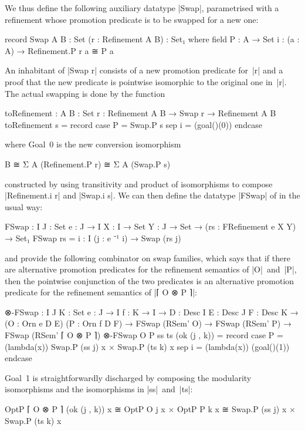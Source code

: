 We thus define the following auxiliary datatype |Swap|, parametrised with a refinement whose promotion predicate is to be swapped for a new one:
\begin{code}
record Swap {A B : Set} (r : Refinement A B) : Set₁ where
  field
    P  : A → Set
    i  : (a : A) → Refinement.P r a ≅ P a
\end{code}
An inhabitant of |Swap r| consists of a new promotion predicate for~|r| and a proof that the new predicate is pointwise isomorphic to the original one in~|r|.
The actual swapping is done by the function
\begin{code}
toRefinement : {A B : Set} {r : Refinement A B} → Swap r → Refinement A B
toRefinement s = record  case  P  = Swap.P s
                         sep   i  = (goal()(0)) endcase
\end{code}
where Goal~0 is the new conversion isomorphism
\begin{code}
B ≅ Σ A (Refinement.P r) ≅ Σ A (Swap.P s)
\end{code}
constructed by using transitivity and product of isomorphisms to compose |Refinement.i r| and |Swap.i s|.
We can then define the datatype |FSwap| of  in the usual way:
\begin{code}
FSwap :  {I J : Set} {e : J → I} {X : I → Set} {Y : J → Set} →
         (rs : FRefinement e X Y) → Set₁
FSwap rs = {i : I} (j : e ⁻¹ i) → Swap (rs j)
\end{code}
and provide the following combinator on swap families, which says that if there are alternative promotion predicates for the refinement semantics of |O|~and~|P|, then the pointwise conjunction of the two predicates is an alternative promotion predicate for the refinement semantics of |⌈ O ⊗ P ⌉|:
\begin{code}
⊗-FSwap :  {I J K : Set} {e : J → I} {f : K → I} →
           {D : Desc I} {E : Desc J} {F : Desc K} →
           (O : Orn e D E) (P : Orn f D F) →
           FSwap (RSem' O) → FSwap (RSem' P) → FSwap (RSem' ⌈ O ⊗ P ⌉)
⊗-FSwap O P ss ts (ok (j , k)) = record
  case  P   = (lambda(x)) Swap.P (ss j) x × Swap.P (ts k) x
  sep   i   = (lambda(x)) (goal()(1)) endcase
\end{code}
Goal~1 is straightforwardly discharged by composing the modularity isomorphisms and the isomorphisms in |ss|~and~|ts|:
\begin{code}
OptP ⌈ O ⊗ P ⌉ (ok (j , k)) x  ≅ OptP O j x       × OptP P k x
                               ≅ Swap.P (ss j) x  × Swap.P (ts k) x
\end{code}

